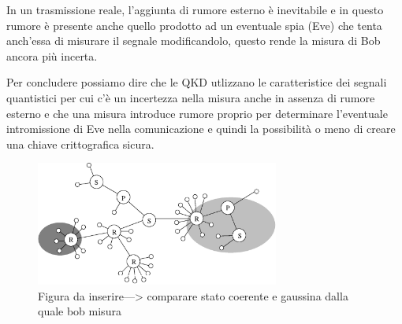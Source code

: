 In un trasmissione reale, l'aggiunta di rumore esterno \`e inevitabile e in questo rumore \`e presente anche quello prodotto ad un eventuale spia (Eve) che tenta anch'essa di misurare il segnale modificandolo, questo rende la misura di Bob ancora pi\`u incerta. 

Per concludere possiamo dire che le QKD utlizzano le caratteristice dei segnali quantistici per cui c'\`e un incertezza nella misura anche in assenza di rumore esterno e che una misura introduce rumore proprio per determinare l'eventuale intromissione di Eve nella comunicazione e quindi la possibilit\`a o meno di creare una chiave crittografica sicura.  


\begin{figure}[bp] 
\begin{center}
\includegraphics[width=8cm]{figure/esempio-figura-1.eps}
\end{center}
\caption{Figura da inserire---> comparare stato coerente e gaussina dalla quale bob misura} \label{fig:bob-misura}
\end{figure}

